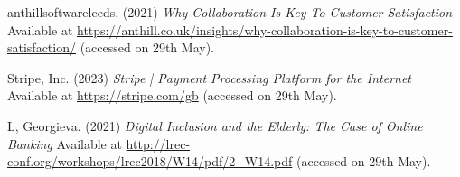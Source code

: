 \noindent [10] anthillsoftwareleeds. (2021) \textit{Why Collaboration Is Key To Customer Satisfaction} Available at \url{https://anthill.co.uk/insights/why-collaboration-is-key-to-customer-satisfaction/} (accessed on 29th May).
\vspace{0.2cm}

\noindent [11] Stripe, Inc. (2023) \textit{Stripe | Payment Processing Platform for the Internet} Available at \url{https://stripe.com/gb} (accessed on 29th May).
\vspace{0.2cm}

\noindent [12] L, Georgieva. (2021) \textit{Digital Inclusion and the Elderly: The Case of Online Banking} Available at \url{http://lrec-conf.org/workshops/lrec2018/W14/pdf/2_W14.pdf} (accessed on 29th May).
\vspace{0.2cm}

\newpage